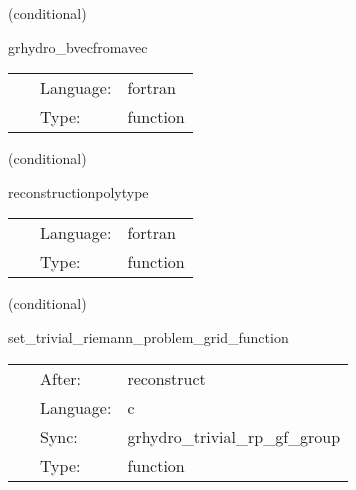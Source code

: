 \vspace{5mm}

   (conditional) 

\hspace{5mm} grhydro\_bvecfromavec 

\hspace{5mm}{\it populate bvec from avec } 


\hspace{5mm}

 \begin{tabular*}{160mm}{cll} 
~ & Language:  & fortran \\ 
~ & Type:  & function \\ 
\end{tabular*} 


\vspace{5mm}

   (conditional) 

\hspace{5mm} reconstructionpolytype 

\hspace{5mm}{\it reconstruct the functions at the cell boundaries } 


\hspace{5mm}

 \begin{tabular*}{160mm}{cll} 
~ & Language:  & fortran \\ 
~ & Type:  & function \\ 
\end{tabular*} 


\vspace{5mm}

   (conditional) 

\hspace{5mm} set\_trivial\_riemann\_problem\_grid\_function 

\hspace{5mm}{\it set the gridfunction for the trp (for debugging only) } 


\hspace{5mm}

 \begin{tabular*}{160mm}{cll} 
~ & After:  & reconstruct \\ 
~ & Language:  & c \\ 
~ & Sync:  & grhydro\_trivial\_rp\_gf\_group \\ 
~ & Type:  & function \\ 
\end{tabular*} 


